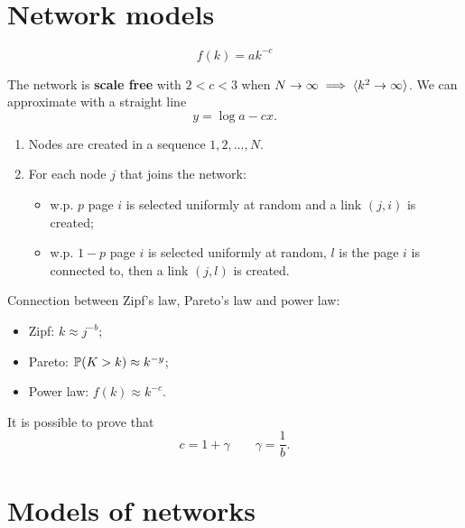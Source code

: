 \documentclass[a4paper,9pt]{extarticle}
\begin{document}
\begin{multicols*}{2}
\section{Network models}
\begin{riquadro}
	\begin{equation*}
		f(k)=ak^{-c}
	\end{equation*}
\end{riquadro}
	The network is \textbf{scale free} with $2<c<3$ when $N\to\infty\implies \langle k^{2}\to\infty \rangle$. We can approximate with a straight line
\begin{equation*}
	y=\log a-cx.
\end{equation*}
\begin{riquadro}
	\begin{enumerate}
		\item Nodes are created in a sequence $1,2,\ldots,N$.
		\item For each node $j$ that joins the network:
		\begin{itemize}
			\item w.p. $p$ page $i$ is selected uniformly at random and a link $(j,i)$ is created;
			\item w.p. $1-p$ page $i$ is selected uniformly at random, $l$ is the page $i$ is connected to, then a link $(j,l)$ is created.
		\end{itemize}
	\end{enumerate}
\end{riquadro}
Connection between Zipf's law, Pareto's law and power law:
\begin{itemize}
	\item Zipf: $k\approx j^{-b}$;
	\item Pareto: $\mathbb{P}(K>k)\approx k^{-y}$;
	\item Power law: $f(k)\approx k^{-c}$.
\end{itemize}
It is possible to prove that 
\begin{equation*}
	c=1+\gamma\qquad\gamma=\frac{1}{b}.
\end{equation*}
\section{Models of networks}

\end{multicols*}
\end{document}
